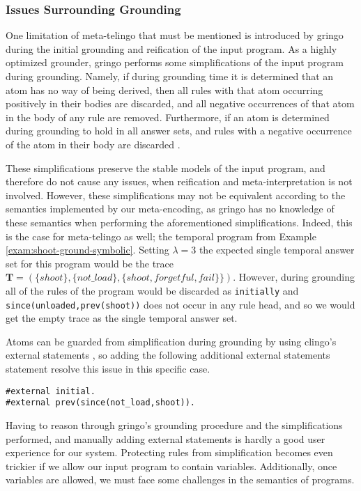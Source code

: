 \subsubsection{Issues Surrounding Grounding}

One limitation of meta-telingo that must be mentioned is introduced by
gringo during the initial grounding and reification of the input
program. As a highly optimized grounder, gringo performs some
simplifications of the input program during grounding. Namely, if
during grounding time it is determined that an atom has no way of
being derived, then all rules with that atom occurring positively in
their bodies are discarded, and all negative occurrences of that atom
in the body of any rule are removed. Furthermore, if an atom is
determined during grounding to hold in all answer sets, and rules with
a negative occurrence of the atom in their body are discarded \cite{gekakasc12a}.

These simplifications preserve the stable models of the input program,
and therefore do not cause any issues, when reification and
meta-interpretation is not involved. However, these simplifications
may not be equivalent according to the semantics implemented by our
meta-encoding, as gringo has no knowledge of these semantics when
performing the aforementioned simplifications. Indeed, this is the
case for meta-telingo as well; the temporal program from Example
\ref{exam:shoot-ground-symbolic}. Setting $\lambda=3$ the expected
single temporal answer set for this program would be the trace
$\bm{T}=(\{ shoot \}, \{ not\_load \}, \{ shoot, forgetful, fail \}
\})$. However, during grounding all of the rules of the program would
be discarded as \verb|initially| and
\verb|since(unloaded,prev(shoot))| does not occur in any rule head,
and so we would get the empty trace as the single temporal answer set.

Atoms can be guarded from simplification during grounding by using
clingo's external statements \cite{PotasscoUserGuide19}, so adding the
following additional external statements statement resolve this issue
in this specific case.

\begin{lstlisting}[language=clingo,numbers=none]
#external initial.
#external prev(since(not_load,shoot)).
\end{lstlisting}

Having to reason through gringo's grounding procedure and the
simplifications performed, and manually adding external statements is
hardly a good user experience for our system. Protecting rules from
simplification becomes even trickier if we allow our input program to
contain variables. Additionally, once variables are allowed, we must
face some challenges in the semantics of programs. 

